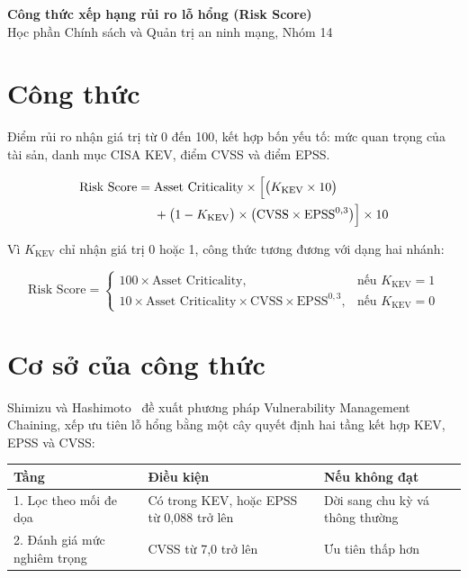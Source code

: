 \documentclass[12pt,a4paper]{article}
\begin{document}
\begin{center}
  {\Large\bfseries Công thức xếp hạng rủi ro lỗ hổng (Risk Score)}\\[4pt]
  Học phần Chính sách và Quản trị an ninh mạng, Nhóm 14
\end{center}

\section{Công thức}

Điểm rủi ro nhận giá trị từ 0 đến 100, kết hợp bốn yếu tố: mức quan trọng của tài sản,
danh mục CISA KEV, điểm CVSS và điểm EPSS.

\begin{equation}
\label{eq:risk}
\begin{split}
\text{Risk Score} = {}& \text{Asset Criticality} \times \Bigl[ \bigl( K_{\text{KEV}} \times 10 \bigr) \\
  &+ \bigl( 1 - K_{\text{KEV}} \bigr) \times \bigl( \text{CVSS} \times \text{EPSS}^{0{,}3} \bigr) \Bigr] \times 10
\end{split}
\end{equation}

Vì $K_{\text{KEV}}$ chỉ nhận giá trị 0 hoặc 1, công thức tương đương với dạng hai nhánh:

\begin{equation}
\text{Risk Score} =
\begin{cases}
  100 \times \text{Asset Criticality}, & \text{nếu } K_{\text{KEV}} = 1 \\[6pt]
  10 \times \text{Asset Criticality} \times \text{CVSS} \times \text{EPSS}^{0{,}3}, & \text{nếu } K_{\text{KEV}} = 0
\end{cases}
\end{equation}

\section{Cơ sở của công thức}

Shimizu và Hashimoto~\cite{shimizu2026vmc} đề xuất phương pháp Vulnerability Management Chaining,
xếp ưu tiên lỗ hổng bằng một cây quyết định hai tầng kết hợp KEV, EPSS và CVSS:

\begin{center}
\begin{tabular}{>{\raggedright}p{4.2cm} >{\raggedright}p{6.2cm} >{\raggedright\arraybackslash}p{4.6cm}}
\toprule
\textbf{Tầng} & \textbf{Điều kiện} & \textbf{Nếu không đạt} \\
\midrule
1. Lọc theo mối đe dọa & Có trong KEV, hoặc EPSS từ 0,088 trở lên & Dời sang chu kỳ vá thông thường \\
2. Đánh giá mức nghiêm trọng & CVSS từ 7,0 trở lên & Ưu tiên thấp hơn \\
\bottomrule
\end{tabular}
\end{center}
\end{document}

